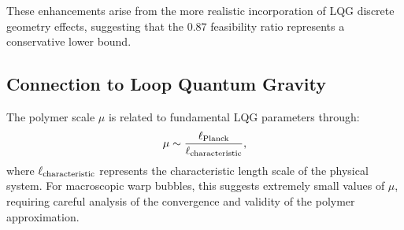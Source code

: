 \documentclass[11pt]{article}
\begin{document}
These enhancements arise from the more realistic incorporation of LQG discrete geometry effects, suggesting that the $0.87$ feasibility ratio represents a conservative lower bound.

\subsection*{Connection to Loop Quantum Gravity}
The polymer scale $\mu$ is related to fundamental LQG parameters through:
\[
  \mu \sim \frac{\ell_{\rm Planck}}{\ell_{\rm characteristic}},
\]
where $\ell_{\rm characteristic}$ represents the characteristic length scale of the physical system. For macroscopic warp bubbles, this suggests extremely small values of $\mu$, requiring careful analysis of the convergence and validity of the polymer approximation.
\end{document}
